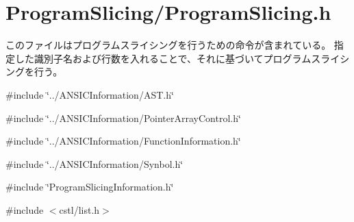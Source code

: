 \section{ProgramSlicing/ProgramSlicing.h}
\label{ProgramSlicing_8h}


このファイルはプログラムスライシングを行うための命令が含まれている。 指定した識別子名および行数を入れることで、それに基づいてプログラムスライシングを行う。  


{\ttfamily \#include \char`\"{}../ANSICInformation/AST.h\char`\"{}}\par
{\ttfamily \#include \char`\"{}../ANSICInformation/PointerArrayControl.h\char`\"{}}\par
{\ttfamily \#include \char`\"{}../ANSICInformation/FunctionInformation.h\char`\"{}}\par
{\ttfamily \#include \char`\"{}../ANSICInformation/Synbol.h\char`\"{}}\par
{\ttfamily \#include \char`\"{}ProgramSlicingInformation.h\char`\"{}}\par
{\ttfamily \#include $<$cstl/list.h$>$}\par
